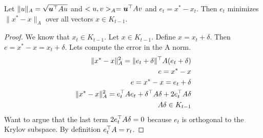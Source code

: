 \documentclass[12pt]{article}
\begin{document}
\begin{lemma}
Let $\|u\|_A = \sqrt{{{\bm{u}}^\top} A u}$ and $<u,v>_A = {{\bm{u}}^\top} A v$ and $e_t = x^* - x_t$. Then $e_t$ minimizes $\|x^* - x\|_A$ over all vectors $x \in K_{t-1}$.
\end{lemma}

\begin{proof}
We know that $x_t \in K_{t-1}$. Let $x \in K_{t-1}$. Define $x = x_t + \delta$. Then $e = x^* - x = x_t + \delta$. Lets compute the error in the A norm.
\begin{align*}
\|x^* - x\|_A^2 = \|e_t + \delta\|^{\top} A(e_t + \delta) \\
e = x^* - x \\
e = x^* - x = e_t + \delta \\ 
\|x^* - x\|_A^2 = e_t^{\top}Ae_t + \delta^{\top}A\delta + 2e_t^{\top} A \delta \\
A\delta \in K_{t-1}
\end{align*}
Want to argue that the last term $2e_t^{\top} A \delta = 0$ because $e_t$ is orthogonal to the Krylov subspace. By definition $e_t^{\top}A = r_t$.
\end{proof}
\end{document}
